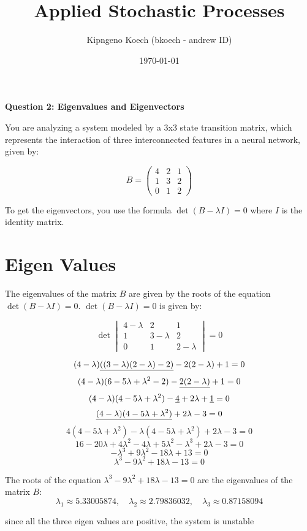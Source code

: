 \documentclass{article}
\title{Applied Stochastic Processes}
\author{Kipngeno Koech (bkoech - andrew ID)}
\date{\today}
\begin{document}
\maketitle

\begin{center}
    \large \textbf{Question 2: Eigenvalues and Eigenvectors}
\end{center}
You are analyzing a system modeled by a 3x3 state transition matrix, which represents the interaction
of three interconnected features in a neural network, given by:

\[
B =
\begin{pmatrix}
4 & 2 & 1 \\
1 & 3 & 2 \\
0 & 1 & 2
\end{pmatrix}
\]

To get the eigenvectors, you use the formula \(\det(B - \lambda I) = 0\) where \(I\) is the identity matrix.

\section{Eigen Values}
The eigenvalues of the matrix \(B\) are given by the roots of the equation \(\det(B - \lambda I) = 0\).
\(\det(B - \lambda I) = 0\) is given by:

\[
\det\begin{vmatrix}
4-\lambda & 2 & 1 \\
1 & 3-\lambda & 2 \\
0 & 1 & 2-\lambda
\end{vmatrix} = 0
\]

\[(4-\lambda)\uline{((3-\lambda)(2-\lambda) - 2)} - 2(2-\lambda) + 1  = 0\]
\[(4-\lambda)(6 - 5\lambda + \lambda^2 - 2) - \uline{2(2-\lambda)} + 1 = 0\]
\[(4-\lambda)(4 - 5\lambda + \lambda^2) -\uline{4} + 2\lambda + \uline{1} = 0\]
\[\uline{(4-\lambda)(4 - 5\lambda + \lambda^2)} + 2\lambda - 3 = 0\]
\[4(4 - 5\lambda + \lambda^2) - \lambda(4 - 5\lambda + \lambda^2) + 2\lambda - 3 = 0\]
\[16 - 20\lambda + 4\lambda^2 - 4\lambda + 5\lambda^2 - \lambda^3 + 2\lambda - 3 = 0\]
\[-\lambda^3 + 9\lambda^2 - 18\lambda + 13 = 0\]
\[\lambda^3 - 9\lambda^2 + 18\lambda - 13 = 0\]

The roots of the equation \(\lambda^3 - 9\lambda^2 + 18\lambda - 13 = 0\) are the eigenvalues of the matrix \(B\):
\[\lambda_1 \approx 5.33005874, \quad \lambda_2 \approx 2.79836032, \quad \lambda_3 \approx 0.87158094\]

since all the three eigen values are positive, the system is unstable
\end{document}
